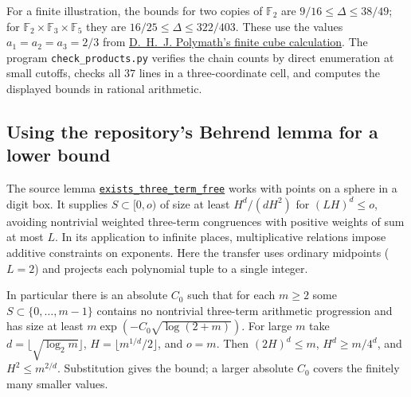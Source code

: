 For a finite illustration, the bounds for two copies of $\mathbb F_2$ are
$9/16\le\Delta\le38/49$; for
$\mathbb F_2\times\mathbb F_3\times\mathbb F_5$ they are
$16/25\le\Delta\le322/403$. These use the values
$a_1=a_2=a_3=2/3$ from
\href{https://arxiv.org/abs/1002.0374}{D.~H.~J. Polymath's finite cube calculation}.
The program \texttt{check\_products.py} verifies the chain counts by direct
enumeration at small cutoffs, checks all $37$ lines in a three-coordinate
cell, and computes the displayed bounds in rational arithmetic.

\subsection{Using the repository's Behrend lemma for a lower bound}
\label{sec:behrend-products}
The source lemma
\href{https://github.com/lsernau/grh-lean/blob/72fead102f663d5c7a407964a13dc0cf9d977207/grh/src/New/Reduction/Data/Existence.lean\#L77-L113}{\texttt{exists\_three\_term\_free}}
works with points on a sphere in a digit box. It supplies $S\subset[0,o)$
of size at least $H^d/(dH^2)$ for $(LH)^d\le o$, avoiding nontrivial
weighted three-term congruences with positive weights of sum at most $L$.
In its application to infinite places, multiplicative relations impose
additive constraints on exponents. Here the transfer uses ordinary
midpoints ($L=2$) and projects each polynomial tuple to a single integer.

In particular there is an absolute $C_0$ such that for each $m\ge2$ some
$S\subset\{0,\ldots,m-1\}$ contains no nontrivial three-term arithmetic
progression and has size at least $m\exp(-C_0\sqrt{\log(2+m)})$.
For large $m$ take $d=\lfloor\sqrt{\log_2m}\rfloor$,
$H=\lfloor m^{1/d}/2\rfloor$, and $o=m$. Then $(2H)^d\le m$,
$H^d\ge m/4^d$, and $H^2\le m^{2/d}$. Substitution gives the bound;
a larger absolute $C_0$ covers the finitely many smaller values.

